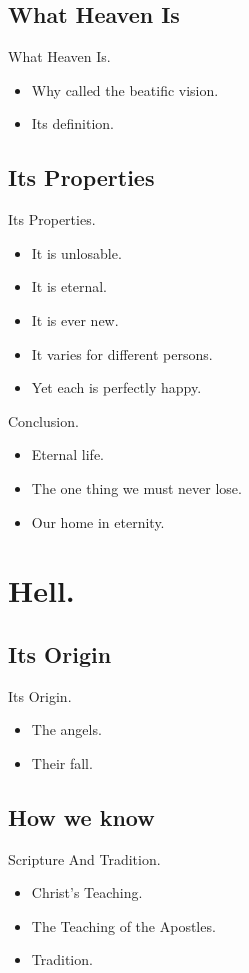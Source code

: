 \documentclass{beamer}
\begin{document}
\subsection{What Heaven Is}
\begin{frame}{What Heaven Is.}
\begin{itemize}
 \item  Why called the beatific vision.
 \item  Its definition.
\end{itemize}
\end{frame}
\subsection{Its Properties}
\begin{frame}{Its Properties.}
\begin{itemize}
 \item  It is unlosable.
 \item  It is eternal.
 \item  It is ever new.
 \item  It varies for different persons.
 \item  Yet each is perfectly happy.
\end{itemize}
\end{frame}
\begin{frame}{Conclusion.}
\begin{itemize}
 \item  Eternal life.
 \item  The one thing we must never lose.
 \item  Our home in eternity.
\end{itemize}
\end{frame}

\section{Hell.}

\subsection{Its Origin}
\begin{frame}{Its Origin.}
\begin{itemize}
 \item  The angels.
 \item  Their fall.
\end{itemize}
\end{frame}
\subsection{How we know}
\begin{frame}{Scripture And Tradition.}
\begin{itemize}
 \item  Christ's Teaching.
 \item  The Teaching of the Apostles.
 \item  Tradition.
\end{itemize}
\end{frame}
\end{document}
